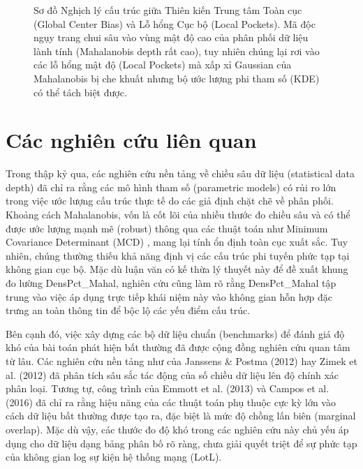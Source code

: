 ﻿\documentclass[../main.tex]{subfiles}
\begin{document}
\begin{figure}[H]
\begin{tikzpicture}[scale=0.85]
\end{tikzpicture}
\caption{Sơ đồ Nghịch lý cấu trúc giữa Thiên kiến Trung tâm Toàn cục (Global Center Bias) và Lỗ hổng Cục bộ (Local Pockets). Mã độc ngụy trang chui sâu vào vùng mật độ cao của phân phối dữ liệu lành tính (Mahalanobis depth rất cao), tuy nhiên chúng lại rơi vào các lỗ hổng mật độ (Local Pockets) mà xấp xỉ Gaussian của Mahalanobis bị che khuất nhưng bộ ước lượng phi tham số (KDE) có thể tách biệt được.}
\label{fig:global_vs_local}
\end{figure}

\section{Các nghiên cứu liên quan}
\label{section:1.7}

Trong thập kỷ qua, các nghiên cứu nền tảng về chiều sâu dữ liệu (statistical data depth) \cite{liu1993quality, zuo2000general} đã chỉ ra rằng các mô hình tham số (parametric models) có rủi ro lớn trong việc ước lượng cấu trúc thực tế do các giả định chặt chẽ về phân phối. Khoảng cách Mahalanobis, vốn là cốt lõi của nhiều thước đo chiều sâu và có thể được ước lượng mạnh mẽ (robust) thông qua các thuật toán như Minimum Covariance Determinant (MCD) \cite{rousseeuw1999fast}, mang lại tính ổn định toàn cục xuất sắc. Tuy nhiên, chúng thường thiếu khả năng định vị các cấu trúc phi tuyến phức tạp tại không gian cục bộ. Mặc dù luận văn có kế thừa lý thuyết này để đề xuất khung đo lường DensPct\_Mahal, nghiên cứu cũng làm rõ rằng DensPct\_Mahal tập trung vào việc áp dụng trực tiếp khái niệm này vào không gian hỗn hợp đặc trưng an toàn thông tin để bộc lộ các yếu điểm cấu trúc.

Bên cạnh đó, việc xây dựng các bộ dữ liệu chuẩn (benchmarks) để đánh giá độ khó của bài toán phát hiện bất thường đã được cộng đồng nghiên cứu quan tâm từ lâu. Các nghiên cứu nền tảng như của Janssens \& Postma (2012) \cite{janssens2012data} hay Zimek et al. (2012) \cite{zimek2012survey} đã phân tích sâu sắc tác động của số chiều dữ liệu lên độ chính xác phân loại. Tương tự, công trình của Emmott et al. (2013) \cite{emmott2013systematic} và Campos et al. (2016) \cite{campos2016evaluation} đã chỉ ra rằng hiệu năng của các thuật toán phụ thuộc cực kỳ lớn vào cách dữ liệu bất thường được tạo ra, đặc biệt là mức độ chồng lấn biên (marginal overlap). Mặc dù vậy, các thước đo độ khó trong các nghiên cứu này chủ yếu áp dụng cho dữ liệu dạng bảng phân bố rõ ràng, chưa giải quyết triệt để sự phức tạp của không gian log sự kiện hệ thống mạng (LotL).
\end{document}
